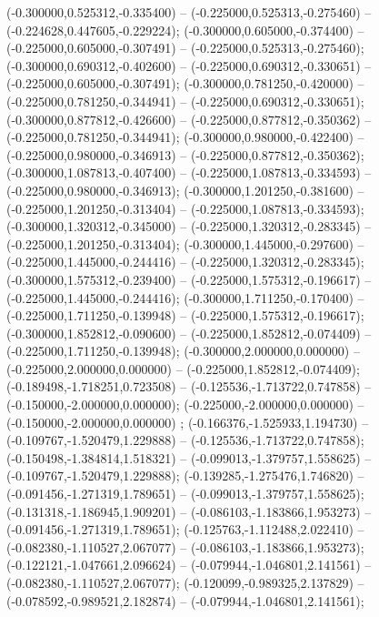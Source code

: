  (-0.300000,0.525312,-0.335400) -- (-0.225000,0.525313,-0.275460) -- (-0.224628,0.447605,-0.229224);
 (-0.300000,0.605000,-0.374400) -- (-0.225000,0.605000,-0.307491) -- (-0.225000,0.525313,-0.275460);
 (-0.300000,0.690312,-0.402600) -- (-0.225000,0.690312,-0.330651) -- (-0.225000,0.605000,-0.307491);
 (-0.300000,0.781250,-0.420000) -- (-0.225000,0.781250,-0.344941) -- (-0.225000,0.690312,-0.330651);
 (-0.300000,0.877812,-0.426600) -- (-0.225000,0.877812,-0.350362) -- (-0.225000,0.781250,-0.344941);
 (-0.300000,0.980000,-0.422400) -- (-0.225000,0.980000,-0.346913) -- (-0.225000,0.877812,-0.350362);
 (-0.300000,1.087813,-0.407400) -- (-0.225000,1.087813,-0.334593) -- (-0.225000,0.980000,-0.346913);
 (-0.300000,1.201250,-0.381600) -- (-0.225000,1.201250,-0.313404) -- (-0.225000,1.087813,-0.334593);
 (-0.300000,1.320312,-0.345000) -- (-0.225000,1.320312,-0.283345) -- (-0.225000,1.201250,-0.313404);
 (-0.300000,1.445000,-0.297600) -- (-0.225000,1.445000,-0.244416) -- (-0.225000,1.320312,-0.283345);
 (-0.300000,1.575312,-0.239400) -- (-0.225000,1.575312,-0.196617) -- (-0.225000,1.445000,-0.244416);
 (-0.300000,1.711250,-0.170400) -- (-0.225000,1.711250,-0.139948) -- (-0.225000,1.575312,-0.196617);
 (-0.300000,1.852812,-0.090600) -- (-0.225000,1.852812,-0.074409) -- (-0.225000,1.711250,-0.139948);
 (-0.300000,2.000000,0.000000) -- (-0.225000,2.000000,0.000000) -- (-0.225000,1.852812,-0.074409);
 (-0.189498,-1.718251,0.723508) -- (-0.125536,-1.713722,0.747858) -- (-0.150000,-2.000000,0.000000);
 (-0.225000,-2.000000,0.000000) -- (-0.150000,-2.000000,0.000000) ;
 (-0.166376,-1.525933,1.194730) -- (-0.109767,-1.520479,1.229888) -- (-0.125536,-1.713722,0.747858);
 (-0.150498,-1.384814,1.518321) -- (-0.099013,-1.379757,1.558625) -- (-0.109767,-1.520479,1.229888);
 (-0.139285,-1.275476,1.746820) -- (-0.091456,-1.271319,1.789651) -- (-0.099013,-1.379757,1.558625);
 (-0.131318,-1.186945,1.909201) -- (-0.086103,-1.183866,1.953273) -- (-0.091456,-1.271319,1.789651);
 (-0.125763,-1.112488,2.022410) -- (-0.082380,-1.110527,2.067077) -- (-0.086103,-1.183866,1.953273);
 (-0.122121,-1.047661,2.096624) -- (-0.079944,-1.046801,2.141561) -- (-0.082380,-1.110527,2.067077);
 (-0.120099,-0.989325,2.137829) -- (-0.078592,-0.989521,2.182874) -- (-0.079944,-1.046801,2.141561);
